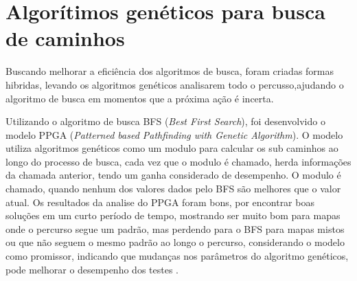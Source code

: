 \section{Algorítimos genéticos para busca de caminhos}
Buscando melhorar a eficiência dos algoritmos de busca, foram criadas formas hibridas, levando os algoritmos genéticos analisarem todo o percusso,ajudando o algoritmo de busca em momentos que a próxima ação é incerta.

Utilizando o algoritmo de busca BFS (\textit{Best First Search}), foi desenvolvido o modelo PPGA (\textit{Patterned based Pathfinding with Genetic Algorithm}). O modelo utiliza algoritmos genéticos como um modulo para calcular os sub caminhos ao longo do processo de busca, cada vez que o modulo é chamado, herda informações da chamada anterior, tendo um ganha considerado de desempenho. O modulo é chamado, quando nenhum dos valores dados pelo BFS são melhores que o valor atual. Os resultados da analise do PPGA foram bons, por encontrar boas soluções em um curto período de tempo, mostrando ser muito bom para mapas onde o percurso segue um padrão, mas perdendo para o BFS para mapas mistos ou que não seguem o mesmo padrão ao longo o percurso, considerando o modelo como promissor, indicando que mudanças nos parâmetros do algoritmo genéticos, pode melhorar o desempenho dos testes \cite{Ulysses}.



\begin{minipage}{\linewidth}
\end{minipage}

